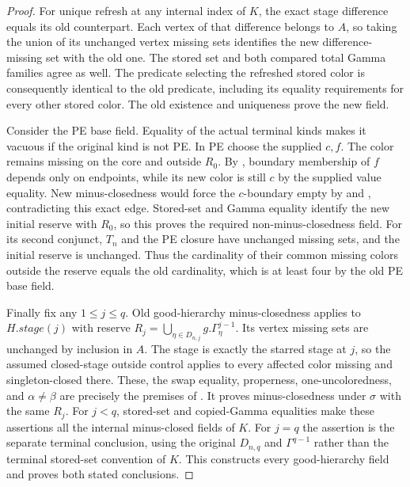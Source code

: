 \begin{proof}
For unique refresh at any internal index of $K$, the exact stage
difference equals its old counterpart.  Each vertex of that difference
belongs to $A$, so taking the union of its unchanged vertex missing sets
identifies the new difference-missing set with the old one.
The stored set and both compared total Gamma families agree as well.
The predicate selecting the refreshed stored color is consequently
identical to the old predicate, including its equality requirements for
every other stored color.  The old existence and uniqueness prove the
new field.

Consider the PE base field.  Equality of the actual terminal kinds makes
it vacuous if the original kind is not PE.  In PE choose the supplied
$c,f$.  The color remains missing on the core and outside $R_0$.
By , boundary membership of $f$ depends only
on endpoints, while its new color is still $c$ by the supplied value
equality.  New minus-closedness would force the $c$-boundary empty by
 and ,
contradicting this exact edge.  Stored-set and Gamma equality identify
the new initial reserve with $R_0$, so this proves the required
non-minus-closedness field.  For its second conjunct, $T_n$ and the PE
closure have unchanged missing sets, and the initial reserve is unchanged.
Thus the cardinality of their common missing colors outside the reserve
equals the old cardinality, which is at least four by the old PE base field.

Finally fix any $1\le j\le q$.  Old good-hierarchy minus-closedness applies
to $H.\mathit{stage}(j)$ with reserve
$R_j=\bigcup_{\eta\in D_{n,j}}g.\Gamma^{j-1}_\eta$.
Its vertex missing sets are unchanged by inclusion in $A$.
The stage is exactly the starred stage at $j$, so the assumed
closed-stage outside control applies to every affected color missing
and singleton-closed there.  These, the swap equality, properness,
one-uncoloredness, and $\alpha\ne\beta$ are precisely the premises of
.  It proves minus-closedness
under $\sigma$ with the same $R_j$.
For $j<q$, stored-set and copied-Gamma equalities make these assertions
all the internal minus-closed fields of $K$.
For $j=q$ the assertion is the separate terminal conclusion, using
the original $D_{n,q}$ and $\Gamma^{q-1}$ rather than the terminal
stored-set convention of $K$.  This constructs every good-hierarchy
field and proves both stated conclusions.
\end{proof}
